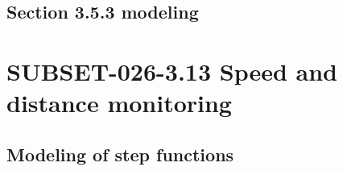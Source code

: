 \documentclass{template/openetcs_report}
\begin{document}


\subsection{Section 3.5.3 modeling}




\section{SUBSET-026-3.13 Speed and distance monitoring}

\subsection{Modeling of step functions}










\end{document}

